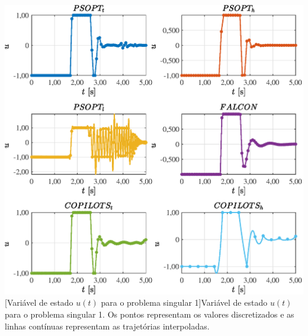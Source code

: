 \noindent
\begin{minipage}{\textwidth}
	\vspace{\onelineskip}
	\centering
	\includegraphics[scale=0.7]{fig/resultados/singular1/traj/u/u}
	[Variável de estado $u(t)$ para o problema singular 1]{Variável de estado $u(t)$ para o problema singular 1. Os pontos representam os valores discretizados e as linhas contínuas representam as trajetórias interpoladas.}
	\label{fig:singular1:u:u}
	\vspace{\onelineskip}
\end{minipage}

